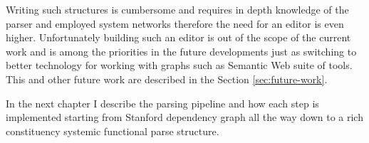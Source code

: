 Writing such structures is cumbersome and requires in depth knowledge of the parser and employed system networks therefore the need for an editor is even higher. Unfortunately building such an editor is out of the scope of the current work and is among the priorities in the future developments just as switching to better technology for working with graphs such as Semantic Web suite of tools. This and other future work are described in the Section \ref{sec:future-work}.

In the next chapter I describe the parsing pipeline and how each step is implemented starting from Stanford dependency graph all the way down to a rich constituency systemic functional parse structure.